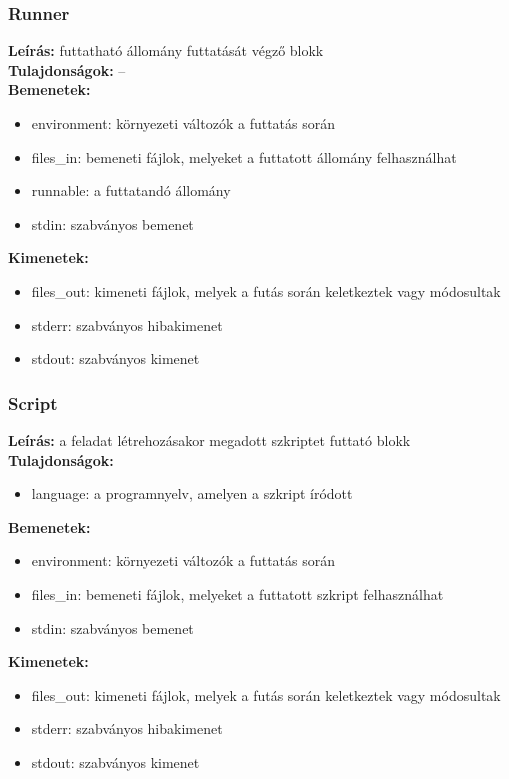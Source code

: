 \subsubsection{Runner}
\textbf{Leírás:} futtatható állomány futtatását végző blokk \\
\textbf{Tulajdonságok:} -- \\
\textbf{Bemenetek:}
\begin{itemize}
    \item environment: környezeti változók a futtatás során
    \item files\_in: bemeneti fájlok, melyeket a futtatott állomány felhasználhat
    \item runnable: a futtatandó állomány
    \item stdin: szabványos bemenet
\end{itemize}
\textbf{Kimenetek:}
\begin{itemize}
    \item files\_out: kimeneti fájlok, melyek a futás során keletkeztek vagy módosultak
    \item stderr: szabványos hibakimenet
    \item stdout: szabványos kimenet
\end{itemize}

\subsubsection{Script}
\textbf{Leírás:} a feladat létrehozásakor megadott szkriptet futtató blokk \\
\textbf{Tulajdonságok:}
\begin{itemize}
    \item language: a programnyelv, amelyen a szkript íródott
\end{itemize}
\textbf{Bemenetek:}
\begin{itemize}
    \item environment: környezeti változók a futtatás során
    \item files\_in: bemeneti fájlok, melyeket a futtatott szkript felhasználhat
    \item stdin: szabványos bemenet
\end{itemize}
\textbf{Kimenetek:}
\begin{itemize}
    \item files\_out: kimeneti fájlok, melyek a futás során keletkeztek vagy módosultak
    \item stderr: szabványos hibakimenet
    \item stdout: szabványos kimenet
\end{itemize}

